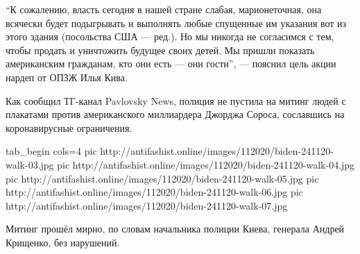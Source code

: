 \enquote{К сожалению, власть сегодня в нашей стране слабая, марионеточная, она
всячески будет подыгрывать и выполнять любые спущенные им указания вот из этого
здания (посольства США — ред.). Но мы никогда не согласимся с тем, чтобы
продать и уничтожить будущее своих детей. Мы пришли показать американским
гражданам, кто они есть — они гости}, — пояснил цель акции нардеп от ОПЗЖ Илья
Кива.

Как сообщил ТГ-канал Pavlovsky News, полиция не пустила на митинг людей с плакатами против американского миллиардера Джорджа Сороса, сославшись на коронавирусные ограничения.

\ifcmt
tab_begin cols=4
pic http://antifashist.online/images/112020/biden-241120-walk-03.jpg
pic http://antifashist.online/images/112020/biden-241120-walk-04.jpg
pic http://antifashist.online/images/112020/biden-241120-walk-05.jpg
pic http://antifashist.online/images/112020/biden-241120-walk-06.jpg
pic http://antifashist.online/images/112020/biden-241120-walk-07.jpg
\fi

Митинг прошёл мирно, по словам начальника полиции Киева, генерала Андрей
Крищенко, без нарушений.

